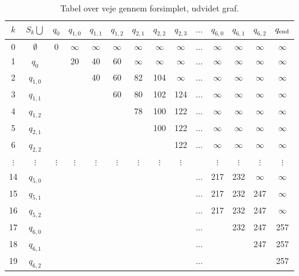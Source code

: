 \begin{table}[H]
\centering
\begin{tabular}{|c|c|c|c|c|c|c|c|c|c|c|c|c|c|} 
\hline
$k$ & $S_k \bigcup$ & $q_{0}$ & $q_{1,0}$ & $q_{1,1}$ & $q_{1,2}$ & $q_{2,1}$ & $q_{2,2}$ & $q_{2,3}$ & $\ldots$ & $q_{6,0}$ & $q_{6,1}$ & $q_{6,2}$ & $q_{\textrm{end}}$ \\
\hline
0 & $\emptyset$ & 0 & $\infty$ & $\infty$ & $\infty$ & $\infty$ & $\infty$ & $\infty$ & $\ldots$ & $\infty$ & $\infty$ & $\infty$ & $\infty$ \\ 
1 & $q_{0}$ & & 20 & 40 & 60 & $\infty$ & $\infty$ & $\infty$ & $\ldots$ & $\infty$ & $\infty$ & $\infty$ & $\infty$\\ 
2 & $q_{1,0}$ & & & 40 & 60 & 82 & 104 & $\infty$ & $\ldots$ & $\infty$ & $\infty$ & $\infty$ & $\infty$\\ 
3 & $q_{1,1}$ & & & & 60 & 80 & 102 & 124 & $\ldots$ & $\infty$ & $\infty$ & $\infty$ & $\infty$\\
4 & $q_{1,2}$ & & & & & 78 & 100 & 122 & $\ldots$ & $\infty$ & $\infty$ & $\infty$ & $\infty$\\ 
5 & $q_{2,1}$ & & & & & & 100 & 122 & $\ldots$ & $\infty$ & $\infty$ & $\infty$ & $\infty$\\ 
6 & $q_{2,2}$ & & & & & & & 122 & $\ldots$ & $\infty$ & $\infty$ & $\infty$ & $\infty$\\  
$\vdots$ & $\vdots$ & $\vdots$ & $\vdots$ & $\vdots$ & $\vdots$ & $\vdots$ & $\vdots$ & $\vdots$ &  & $\vdots$ & $\vdots$ & $\vdots$ & $\vdots$\\ 
14 & $q_{5,0}$ &  &  &  &  &  &  &  & $\ldots$ & 217 & 232 & $\infty$ & $\infty$\\ 
15 & $q_{5,1}$ &  &  &  &  &  &  &  & $\ldots$ & 217 & 232 & 247 & $\infty$\\ 
16 & $q_{5,2}$ &  &  &  &  &  &  &  & $\ldots$ & 217 & 232 & 247 & $\infty$\\ 
17 & $q_{6,0}$ &  &  &  &  &  &  &  & $\ldots$ &  & 232 & 247 & 257\\ 
18 & $q_{6,1}$ &  &  &  &  &  &  &  & $\ldots$ &  &  & 247 & 257\\ 
19 & $q_{6,2}$ &  &  &  &  &  &  &  & $\ldots$ &  &  &  & 257\\ 
\hline
\end{tabular}
\caption{Tabel over veje gennem forsimplet, udvidet graf.}
\label{table:forsimplet_udvidet_graf}
\end{table}